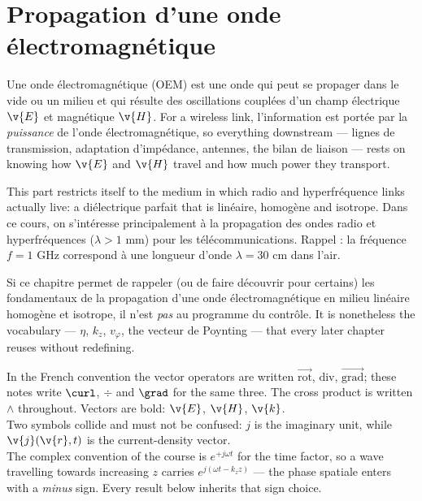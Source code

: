 \section{Propagation d'une onde électromagnétique}
Une onde électromagnétique (OEM) est une onde qui peut se propager dans le vide
ou un milieu et qui résulte des oscillations couplées d'un champ électrique
$\v{E}$ et magnétique $\v{H}$. For a wireless link, l'information est portée par
la \emph{puissance} de l'onde électromagnétique, so everything downstream ---
lignes de transmission, adaptation d'impédance, antennes, the bilan de liaison
--- rests on knowing how $\v{E}$ and $\v{H}$ travel and how much power they
transport.

This part restricts itself to the medium in which radio and hyperfréquence links
actually live: a diélectrique parfait that is linéaire, homogène and isotrope.
Dans ce cours, on s'intéresse principalement à la propagation des ondes radio et
hyperfréquences ($\lambda > 1$ mm) pour les télécommunications. Rappel : la
fréquence $f = 1$ GHz correspond à une longueur d'onde $\lambda = 30$ cm dans
l'air.

\begin{remark}
  Si ce chapitre permet de rappeler (ou de faire découvrir pour certains) les
  fondamentaux de la propagation d'une onde électromagnétique en milieu linéaire
  homogène et isotrope, il n'est \emph{pas} au programme du contrôle. It is
  nonetheless the vocabulary --- $\eta$, $k_z$, $v_\varphi$, the vecteur de
  Poynting --- that every later chapter reuses without redefining.
\end{remark}

\begin{notation}
  In the French convention the vector operators are written
  $\overrightarrow{\mathrm{rot}}$, $\mathrm{div}$,
  $\overrightarrow{\mathrm{grad}}$; these notes write $\curl$, $\div$ and
  $\grad$ for the same three. The cross product is written $\wedge$
  throughout. Vectors are bold: $\v{E}$, $\v{H}$, $\v{k}$.\\

  Two symbols collide and must not be confused: $j$ is the imaginary unit,
  while $\v{j}(\v{r},t)$ is the current-density vector.\\

  The complex convention of the course is $e^{+j\omega t}$ for the time factor,
  so a wave travelling towards increasing $z$ carries
  $e^{j(\omega t - k_z z)}$ --- the phase spatiale enters with a \emph{minus}
  sign. Every result below inherits that sign choice.
\end{notation}

